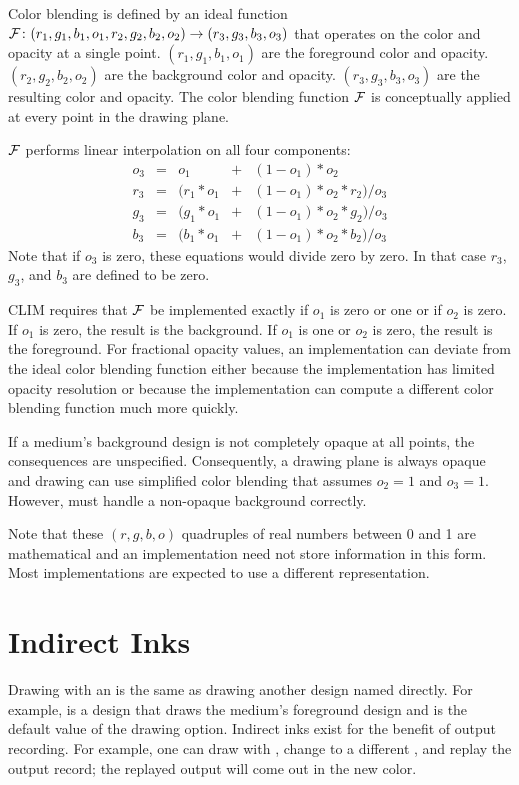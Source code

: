 Color blending is defined by an ideal function
${\cal F}\colon (r_1,g_1,b_1,o_1,r_2,g_2,b_2,o_2)\rightarrow (r_3,g_3,b_3,o_3)$
that operates on the color and opacity at a single point.
$(r_1,g_1,b_1,o_1)$ are the foreground color and opacity.
$(r_2,g_2,b_2,o_2)$ are the background color and opacity.
$(r_3,g_3,b_3,o_3)$ are the resulting color and opacity.  The color
blending function ${\cal F}$ is conceptually applied at every point in the
drawing plane.

${\cal F}$ performs linear interpolation on all four components:
\[ \begin{array}{rcrcl}
o_3 & = &        o_1 & + & (1 - o_1) * o_2 \\
r_3 & = & (r_1 * o_1 & + & (1 - o_1) * o_2 * r_2) / o_3 \\
g_3 & = & (g_1 * o_1 & + & (1 - o_1) * o_2 * g_2) / o_3 \\
b_3 & = & (b_1 * o_1 & + & (1 - o_1) * o_2 * b_2) / o_3
\end{array} \]
Note that if $o_3$ is zero, these equations would divide zero by zero.
In that case $r_3$, $g_3$, and $b_3$ are defined to be zero.

CLIM requires that ${\cal F}$ be implemented exactly if $o_1$ is zero or one or
if $o_2$ is zero.  If $o_1$ is zero, the result is the background.  If $o_1$ is
one or $o_2$ is zero, the result is the foreground.  For fractional opacity
values, an implementation can deviate from the ideal color blending function
either because the implementation has limited opacity resolution or because the
implementation can compute a different color blending function much more
quickly.

If a medium's background design is not completely opaque at all points, the
consequences are unspecified.  Consequently, a drawing plane is always opaque
and drawing can use simplified color blending that assumes $o_2 = 1$ and
$o_3 = 1$.  However,  must handle a non-opaque background
correctly.

Note that these $(r,g,b,o)$ quadruples of real numbers between 0 and 1 are
mathematical and an implementation need not store information in this form.
Most implementations are expected to use a different representation.


\section {Indirect Inks}

Drawing with an  is the same as drawing another design
named directly.  For example,  is a design that draws the
medium's foreground design and is the default value of the  drawing
option.  Indirect inks exist for the benefit of output recording.  For example,
one can draw with , change to a different
, and replay the output record; the replayed output will
come out in the new color.

